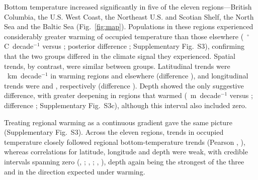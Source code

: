 \documentclass[9pt,twocolumn,twoside]{pnas-new}
\begin{document}
Bottom temperature increased significantly in five of the eleven regions---British Columbia, the U.S. West Coast, the Northeast U.S. and Scotian Shelf, the North Sea and the Baltic Sea (Fig.~\ref{fig:map}). Populations in these regions experienced considerably greater warming of occupied temperature than those elsewhere (\WarmGrpWarmThermalMedian{}~$^\circ$C~decade$^{-1}$ \WarmGrpWarmThermalCI{} versus \WarmGrpNonWarmThermalMedian{} \WarmGrpNonWarmThermalCI{}; posterior difference \WarmGrpDiffThermalMedian{} \WarmGrpDiffThermalCI{}; Supplementary Fig.~S3), confirming that the two groups differed in the climate signal they experienced. Spatial trends, by contrast, were similar between groups. Latitudinal trends were \WarmGrpWarmLatMedian{}~km~decade$^{-1}$ \WarmGrpWarmLatCI{} in warming regions and \WarmGrpNonWarmLatMedian{} \WarmGrpNonWarmLatCI{} elsewhere (difference \WarmGrpDiffLatMedian{} \WarmGrpDiffLatCI{}), and longitudinal trends were \WarmGrpWarmLonMedian{} \WarmGrpWarmLonCI{} and \WarmGrpNonWarmLonMedian{} \WarmGrpNonWarmLonCI{}, respectively (difference \WarmGrpDiffLonMedian{} \WarmGrpDiffLonCI{}). Depth showed the only suggestive difference, with greater deepening in regions that warmed (\WarmGrpWarmDepthMedian{}~m~decade$^{-1}$ \WarmGrpWarmDepthCI{} versus \WarmGrpNonWarmDepthMedian{} \WarmGrpNonWarmDepthCI{}; difference \WarmGrpDiffDepthMedian{} \WarmGrpDiffDepthCI{}; Supplementary Fig.~S3c), although this interval also included zero.

Treating regional warming as a continuous gradient gave the same picture (Supplementary Fig.~S3). Across the eleven regions, trends in occupied temperature closely followed regional bottom-temperature trends (Pearson \CorThermal{}, \CorThermalCI{}), whereas correlations for latitude, longitude and depth were weak, with credible intervals spanning zero (\CorLat{}, \CorLatCI{}; \CorLon{}, \CorLonCI{}; \CorDepth{}, \CorDepthCI{}), depth again being the strongest of the three and in the direction expected under warming.
\end{document}
